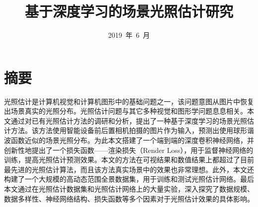 \confidential{}%
\title{基于深度学习的场景光照估计研究}%
\author{}%
\advisor{}%
\date{2019~年~6~月}%
\AUTHOR{}%
\ADVISOR{}%
\maketitle%
\MAKETITLE%
\makedeclaration%
\chapter*{摘\quad 要}
\setcounter{page}{1}%
光照估计是计算机视觉和计算机图形中的基础问题之一，该问题意图从图片中恢复出场景真实的光照分布。光照估计问题与其它多种视觉和图形学问题息息相关。本文通过对已有光照估计方法的调研和分析，提出了一种基于深度学习的场景光照估计方法。该方法使用智能设备前后置相机拍摄的图片作为输入，预测出使用球形谐波函数近似的场景光照分布。为此本文搭建了一个端到端的深度卷积神经网络，并创新性地提出了一个损失函数——渲染损失（Render Loss），用于监督神经网络的训练，提高光照估计预测效果。本文的方法在可视结果和数值结果上都超过了目前最先进的光照估计算法，而且该方法真实场景中的效果也非常理想。此外，本文还构建了一个大规模的高动态范围全景数据集，用于训练和测试光照估计网络。最后本文通过在光照估计数据集和光照估计网络上的大量实验，深入探究了数据规模、数据多样性、神经网络结构、损失函数等多个因素对于光照估计效果的具体影响。


